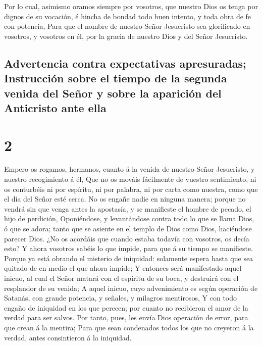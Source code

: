  Por lo cual, asimismo oramos siempre por vosotros, que
nuestro Dios os tenga por dignos de su vocación, é hincha de bondad todo
buen intento, y toda obra de fe con potencia,  Para que el
nombre de nuestro Señor Jesucristo sea glorificado en vosotros, y
vosotros en él, por la gracia de nuestro Dios y del Señor Jesucristo.

\hypertarget{advertencia-contra-expectativas-apresuradas-instrucciuxf3n-sobre-el-tiempo-de-la-segunda-venida-del-seuxf1or-y-sobre-la-apariciuxf3n-del-anticristo-ante-ella}{%
\subsection{Advertencia contra expectativas apresuradas; Instrucción
sobre el tiempo de la segunda venida del Señor y sobre la aparición del
Anticristo ante
ella}\label{advertencia-contra-expectativas-apresuradas-instrucciuxf3n-sobre-el-tiempo-de-la-segunda-venida-del-seuxf1or-y-sobre-la-apariciuxf3n-del-anticristo-ante-ella}}

\hypertarget{section-1}{%
\section{2}\label{section-1}}

 Empero os rogamos, hermanos, cuanto á la venida de nuestro
Señor Jesucristo, y nuestro recogimiento á él,  Que no os
mováis fácilmente de vuestro sentimiento, ni os conturbéis ni por
espíritu, ni por palabra, ni por carta como nuestra, como que el día del
Señor esté cerca.  No os engañe nadie en ninguna manera;
porque no vendrá sin que venga antes la apostasía, y se manifieste el
hombre de pecado, el hijo de perdición,  Oponiéndose, y
levantándose contra todo lo que se llama Dios, ó que se adora; tanto que
se asiente en el templo de Dios como Dios, haciéndose parecer Dios.
 ¿No os acordáis que cuando estaba todavía con vosotros, os
decía esto?  Y ahora vosotros sabéis lo que impide, para que
á su tiempo se manifieste.  Porque ya está obrando el
misterio de iniquidad: solamente espera hasta que sea quitado de en
medio el que ahora impide;  Y entonces será manifestado
aquel inicuo, al cual el Señor matará con el espíritu de su boca, y
destruirá con el resplandor de su venida;  A aquel inicuo,
cuyo advenimiento es según operación de Satanás, con grande potencia, y
señales, y milagros mentirosos,  Y con todo engaño de
iniquidad en los que perecen; por cuanto no recibieron el amor de la
verdad para ser salvos.  Por tanto, pues, les envía Dios
operación de error, para que crean á la mentira;  Para que
sean condenados todos los que no creyeron á la verdad, antes
consintieron á la iniquidad.

